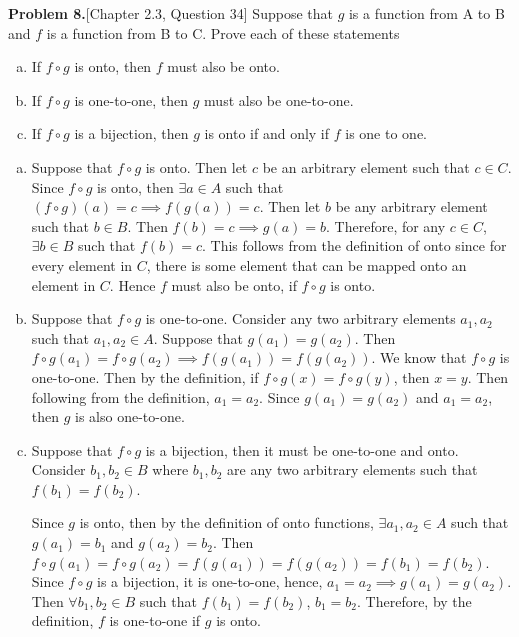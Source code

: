 \documentclass[addpoints]{exam}
\begin{document}
\begin{sloppypar}
\begin{questions}
    \question\textbf{Problem 8.}[Chapter 2.3, Question 34]
    Suppose that $g$ is a function from A to B and $f$ is a function from B to C. Prove each of these statements
        \begin{enumerate}[(a)]
            \item If $f \circ g$ is onto, then $f$ must also be onto.
            \item If $f \circ g$ is one-to-one, then $g$ must also be one-to-one.
            \item If $f \circ g$ is a bijection, then $g$ is onto if and only if $f$ is one to one. 
        \end{enumerate}
        \begin{solution}
            \begin{enumerate}[(a)]
                \item Suppose that $ f \circ g $ is onto. Then let $c$ be an arbitrary element such that $ c \in C $. Since $f \circ g$ is onto, then $ \exists a \in A $ such that $ (f \circ g) (a) = c \implies f(g(a)) = c$. Then let $b$ be any arbitrary element such that $b \in B$. Then $ f(b) = c \implies g(a) = b $. Therefore, for any $c \in C$, $ \exists b \in B $ such that $ f(b) = c $. This follows from the definition of onto since for every element in $C$, there is some element that can be mapped onto an element in $C$. Hence $f$ must also be onto, if $f \circ g$ is onto.
                
                \item Suppose that $ f \circ g $ is one-to-one. Consider any two arbitrary elements $ a_1, a_2 $ such that $ a_1, a_2 \in A $. Suppose that $ g(a_1) = g(a_2)$. Then $ f \circ g (a_1) = f \circ g (a_2) \implies f(g(a_1)) = f(g(a_2))$. We know that $ f \circ g $ is one-to-one. Then by the definition, if $ f \circ g (x) = f \circ g (y) $, then $ x = y $. Then following from the definition, $ a_1 = a_2 $. Since $ g(a_1) = g(a_2) $ and $ a_1 = a_2 $, then $g$ is also one-to-one.   
                
                \item Suppose that $ f \circ g $ is a bijection, then it must be one-to-one and onto. Consider $ b_1, b_2 \in B $ where $ b_1, b_2 $ are any two arbitrary elements such that $ f(b_1) = f(b_2) $. 
                
                Since $g$ is onto, then by the definition of onto functions, $ \exists a_1, a_2 \in A $ such that $ g(a_1) = b_1 $ and $ g(a_2) = b_2 $. Then $ f \circ g (a_1) = f \circ g (a_2) = f(g(a_1)) = f(g(a_2)) = f(b_1) = f(b_2) $. Since $ f \circ g $ is a bijection, it is one-to-one, hence, $a_1 = a_2 \implies g(a_1) = g(a_2)$. Then $ \forall b_1, b_2 \in B $ such that $ f(b_1) = f(b_2) $, $ b_1 = b_2 $. Therefore, by the definition, $f$ is one-to-one if $g$ is onto. 
                

\end{enumerate}
\end{solution}
\end{questions}
\end{sloppypar}
\end{document}
